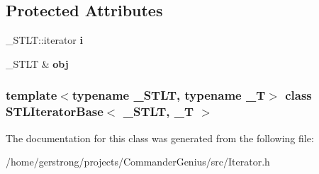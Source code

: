 \subsection*{Protected Attributes}
\begin{DoxyCompactItemize}
\item 
\hypertarget{class_s_t_l_iterator_base_a2d63988d177722ae755fce3d6d0358c4}{
\_\-STLT::iterator {\bfseries i}}
\label{class_s_t_l_iterator_base_a2d63988d177722ae755fce3d6d0358c4}

\item 
\hypertarget{class_s_t_l_iterator_base_ab184cdf928d5989f186de3fee0658527}{
\_\-STLT \& {\bfseries obj}}
\label{class_s_t_l_iterator_base_ab184cdf928d5989f186de3fee0658527}

\end{DoxyCompactItemize}
\subsubsection*{template$<$typename \_\-STLT, typename \_\-T$>$ class STLIteratorBase$<$ \_\-STLT, \_\-T $>$}



The documentation for this class was generated from the following file:\begin{DoxyCompactItemize}
\item 
/home/gerstrong/projects/CommanderGenius/src/Iterator.h\end{DoxyCompactItemize}
